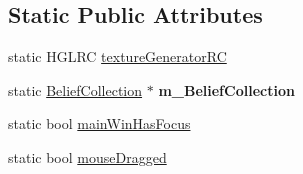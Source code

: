 \subsection*{Static Public Attributes}
\begin{DoxyCompactItemize}
\item 
static HGLRC \hyperlink{class_mosaic_base_a450fb048b4345e6547721b3e14f07176}{textureGeneratorRC}
\item 
\hypertarget{class_mosaic_base_a6fbc2c6f41130ae1a0cca6fc7f234119}{
static \hyperlink{class_belief_collection}{BeliefCollection} $\ast$ {\bfseries m\_\-BeliefCollection}}
\label{class_mosaic_base_a6fbc2c6f41130ae1a0cca6fc7f234119}

\item 
static bool \hyperlink{class_mosaic_base_a3a0a70f84bf767ff0f42bbac37123754}{mainWinHasFocus}
\item 
static bool \hyperlink{class_mosaic_base_a4bfbec52e7e71d6e89b62f45384c330b}{mouseDragged}
\end{DoxyCompactItemize}
